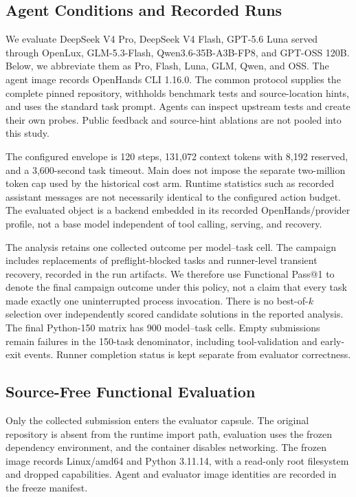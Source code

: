 \documentclass[acmsmall,screen,review,anonymous]{acmart}
\begin{document}
\subsection{Agent Conditions and Recorded Runs}

We evaluate DeepSeek V4 Pro, DeepSeek V4 Flash, GPT-5.6 Luna served through
OpenLux, GLM-5.3-Flash, Qwen3.6-35B-A3B-FP8, and GPT-OSS 120B. Below, we
abbreviate them as Pro, Flash, Luna, GLM, Qwen, and OSS. The agent image records
OpenHands CLI 1.16.0. The common protocol supplies the complete pinned repository,
withholds benchmark tests and source-location hints, and uses the standard task
prompt. Agents can inspect upstream tests and create their own probes. Public
feedback and source-hint ablations are not pooled into this study.

The configured envelope is 120 steps, 131,072 context tokens with 8,192 reserved,
and a 3,600-second task timeout. Main does not impose the separate two-million
token cap used by the historical cost arm. Runtime statistics such as recorded
assistant messages are not necessarily identical to the configured action budget.
The evaluated object is a backend embedded in its recorded OpenHands/provider
profile, not a base model independent of tool calling, serving, and recovery.

The analysis retains one collected outcome per model--task cell. The campaign
includes replacements of preflight-blocked tasks and runner-level transient
recovery, recorded in the run artifacts. We therefore use Functional Pass@1 to
denote the final campaign outcome under this policy, not a claim that every task
made exactly one uninterrupted process invocation. There is no best-of-$k$
selection over independently scored candidate solutions in the reported analysis.
The final Python-150 matrix has 900 model--task cells. Empty submissions remain
failures in the 150-task denominator, including tool-validation and early-exit
events. Runner completion status is kept separate from evaluator correctness.

\subsection{Source-Free Functional Evaluation}

Only the collected submission enters the evaluator capsule. The original
repository is absent from the runtime import path, evaluation uses the frozen
dependency environment, and the container disables networking. The frozen image
records Linux/amd64 and Python 3.11.14, with a read-only root filesystem and
dropped capabilities. Agent and evaluator image identities are recorded in the
freeze manifest.
\end{document}
